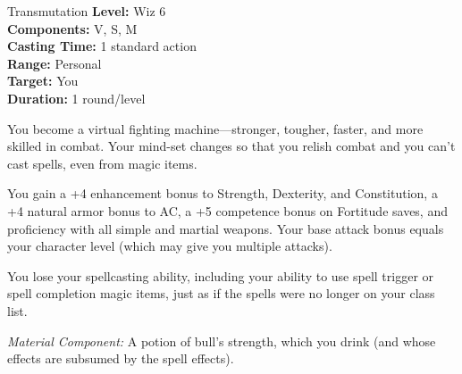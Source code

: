 {Transmutation}
{
	\textbf{Level:}
	Wiz 6\\
	\textbf{Components:}
	V, S, M\\
	\textbf{Casting Time:}
	1 standard action\\
	\textbf{Range:}
	Personal\\
	\textbf{Target:}
	You\\
	\textbf{Duration:}
	1 round/level\\
}
{
	You become a virtual fighting machine---stronger, tougher, faster, and more skilled in combat. Your mind-set changes so that you relish combat and you can't cast spells, even from magic items.

	You gain a +4 enhancement bonus to Strength, Dexterity, and Constitution, a +4 natural armor bonus to AC, a +5 competence bonus on Fortitude saves, and proficiency with all simple and martial weapons. Your base attack bonus equals your character level (which may give you multiple attacks).

	You lose your spellcasting ability, including your ability to use spell trigger or spell completion magic items, just as if the spells were no longer on your class list.

	\textit{Material Component:}
	A potion of bull's strength, which you drink (and whose effects are subsumed by the spell effects).

}
